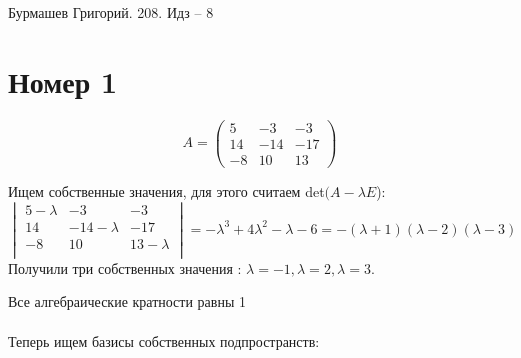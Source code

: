 \documentclass[a4paper,12pt]{article}
\author{Бурмашев Григорий, БПМИ-208}
\title{}
\date{\today}
\begin{document}
\begin{center}
Бурмашев Григорий. 208. Идз -- 8 
\end{center}

\section*{Номер 1}
\[
A = \begin{pmatrix}
5 & -3 & -3 \\
14 & -14 & -17 \\
-8 & 10 & 13
\end{pmatrix}
\]

Ищем собственные значения, для этого считаем det$(A - \lambda E$):
\[
\begin{vmatrix}
5 - \lambda& -3 & -3 \\
14 & -14 - \lambda & -17 \\
-8 & 10 & 13 - \lambda \\
\end{vmatrix} =
-\lambda^3 + 4\lambda^2 - \lambda -6 = -(\lambda + 1) (\lambda - 2) (\lambda -3 )
\]
Получили три собственных значения : $\lambda = -1, \lambda = 2, \lambda = 3$. 

Все алгебраические кратности равны 1
\\\\
Теперь ищем базисы собственных подпространств:
\end{document}
